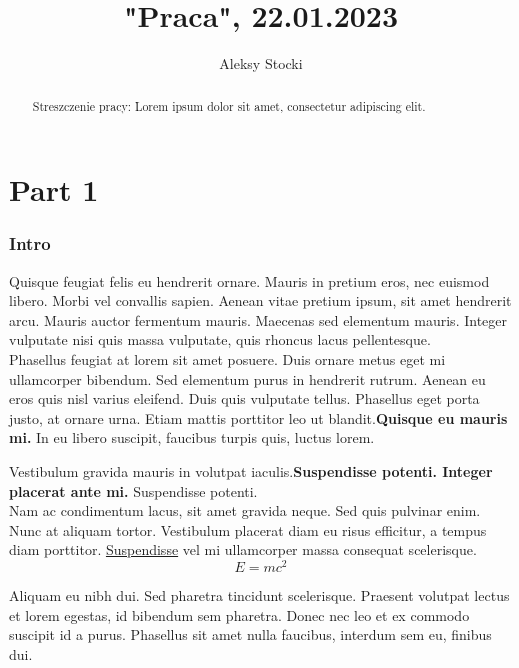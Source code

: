\documentclass[12pt,a4paper]{article}
\title{"Praca", 22.01.2023}
\author{Aleksy Stocki}
\begin{document}
\maketitle

\begin{abstract}
Streszczenie pracy: Lorem ipsum dolor sit amet, consectetur adipiscing elit.
\end{abstract}

\newpage

\tableofcontents

\newpage

\part {Part 1}

\section{Intro}
Quisque feugiat felis eu hendrerit ornare. Mauris in pretium eros, nec euismod libero. Morbi vel convallis sapien. Aenean vitae pretium ipsum, sit amet hendrerit arcu. Mauris auctor fermentum mauris. Maecenas sed elementum mauris. Integer vulputate nisi quis massa vulputate, quis rhoncus lacus pellentesque. \\Phasellus feugiat at lorem sit amet posuere. Duis ornare metus eget mi ullamcorper bibendum. Sed elementum purus in hendrerit rutrum. Aenean eu eros quis nisl varius eleifend. Duis quis vulputate tellus. Phasellus eget porta justo, at ornare urna. Etiam mattis porttitor leo ut blandit.\textbf{Quisque eu mauris mi.} In eu libero suscipit, faucibus turpis quis, luctus lorem.

Vestibulum gravida mauris in volutpat iaculis.\textbf{Suspendisse potenti. Integer placerat ante mi.} Suspendisse potenti.\\Nam ac condimentum lacus, sit amet gravida neque. Sed quis pulvinar enim. Nunc at aliquam tortor. Vestibulum placerat diam eu risus efficitur, a tempus diam porttitor. \underline{Suspendisse} vel mi ullamcorper massa consequat scelerisque.
\[E=mc^2\]

Aliquam eu nibh dui. Sed pharetra tincidunt scelerisque. Praesent volutpat lectus et lorem egestas, id bibendum sem pharetra. Donec nec leo et ex commodo suscipit id a purus. Phasellus sit amet nulla faucibus, interdum sem eu, finibus dui.
\end{document}
